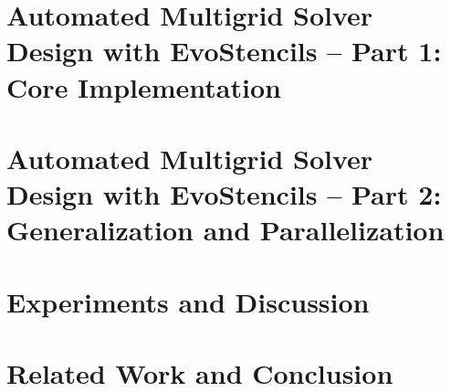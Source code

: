 \documentclass[
  paper = 17x24,
  language = english,
  acronym = nosymbol,
  acronymline = novertical,
  bibliography = combined,
  bibliographypart = all,
  titlesize = Huge,
  par = halfskip,
]{faupress}
\theoremstyle{definition}
\numberwithin{equation}{chapter}
\begin{document}
\chapter{Automated Multigrid Solver Design with EvoStencils -- Part 1: Core Implementation}
\label{chapter:evostencils-1}
  
\chapter{Automated Multigrid Solver Design with EvoStencils -- Part 2: Generalization and Parallelization}
  \label{chapter:evostencils-2}
  
\chapter{Experiments and Discussion}
\label{chapter:experiments}
  
\chapter{Related Work and Conclusion}
  
  

\appendix 


\backmatter
  \faupressprintbibliography
   \faupressprintacronyms
  \begingroup
  \listofalgorithms
  \let\clearpage\relax
  \listoflistings
  \endgroup
\end{document}
